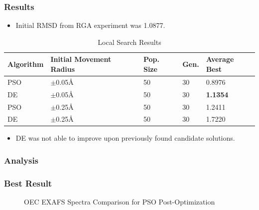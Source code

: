 \documentclass[10pt]{beamer}
\begin{document}
\begin{frame}
	\frametitle{Results}

	\begin{itemize}
		\item Initial RMSD from RGA experiment was 1.0877.
	\end{itemize}

	\begin{table}
		\caption{Local Search Results}
		\centering
		\begin{tabular}{ | l | l | l | l | l | }
		  \hline
		    Algorithm & Initial Movement Radius & Pop. Size & Gen. & Average Best \\ \hline \hline
		    PSO & $\pm$0.05\AA & 50 & 30 & 0.8976 \\ \hline
		    DE & $\pm$0.05\AA & 50 & 30 & \textbf{1.1354} \\ \hline
		    PSO & $\pm$0.25\AA & 50 & 30 & 1.2411 \\ \hline
		    DE & $\pm$0.25\AA & 50 & 30 & 1.7220 \\ \hline
		\end{tabular}
	\end{table}

	\begin{itemize}
		\item DE was not able to improve upon previously found candidate solutions.
	\end{itemize}

\end{frame}

\begin{frame}
	\frametitle{Analysis}

\end{frame}

\begin{frame}
	\frametitle{Best Result}

	\begin{figure}
		\caption{OEC EXAFS Spectra Comparison for PSO Post-Optimization}
	\end{figure}

\end{frame}
\end{document}
